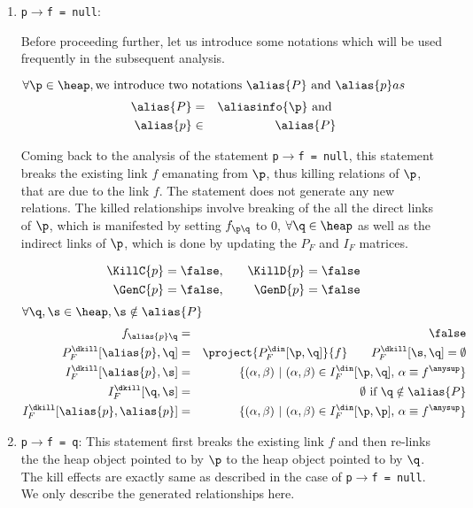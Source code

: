 \begin{enumerate}
\item {\tt p$\rightarrow$f = null}: 
{\blue
Before proceeding further, let us introduce some notations which will be used frequently in the subsequent analysis.

$\forall \p \in \heap, \mbox{we introduce two notations } \alias{P} \mbox{ and }  \alias{p} as$
\begin{eqnarray*}
    \alias{P} &=& \aliasinfo{\p} \mbox{ and } \\
    \alias{p} &\in& \alias{P}
\end{eqnarray*}
}

Coming back to the analysis of the statement {\tt p$\rightarrow$f = null}, this statement breaks the existing link $f$ emanating from
$\p$, thus killing relations of $\p$, that are due to the link
$f$. The statement does not generate any new relations. The killed
relationships involve breaking of the all the direct links
of $\p$, which is manifested by setting $f_{\p\q}$ to 0, $\forall \q \in \heap$ 
as well as the indirect links of $\p$, which is done by updating the $P_F$ and $I_F$
matrices. 

{\blue 
\begin{eqnarray*}
\KillC{p}  = \false, &\quad& \KillD{p} = \false \\
\GenC{p} = \false,   &\quad& \GenD{p} = \false  \\
\end{eqnarray*}
$\forall \q,\s \in \heap, \s \notin \alias{P}$ \\
\begin{eqnarray*}
	  f_{\alias{p}\q}   			&=& \false  \\
	  P_F^{\dkill}[\alias{p}, \q]  	&=& \project{P_F^{\din}[\p, \q]}{f} \qquad    {P_F^{{\dkill}}[\s, \q]}  = \emptyset    \\
 	  I_F^{\dkill}[\alias{p}, \s]  	&=& \{(\alpha,  \beta) \ \vert\ (\alpha, \beta) \in I_F^{\din}[\p,  \q] \mbox, \ \alpha \equiv f^\anysup \} \\ 
 	  I_F^{\dkill}[\q, \s] 			&=& \emptyset \mbox{ if } \q \notin \alias{P}  \\
 	  I_F^{\dkill}[\alias{p}, \alias{p}] &=& \{(\alpha,  \beta) \ \vert\ (\alpha, \beta) \in I_F^{\din}[\p,  \p] \mbox, \ \alpha \equiv f^\anysup \} \\
\end{eqnarray*}
}
\item {\tt p$\rightarrow$f = q}: 
This statement first breaks
  the existing link $f$ and then re-links the the heap object
  pointed to by $\p$ to the heap object pointed to by
  $\q$. The kill effects are exactly same as described in the
  case of  {\tt p$\rightarrow$f = null}. We only describe the
  generated relationships here. 
  

\end{enumerate}
